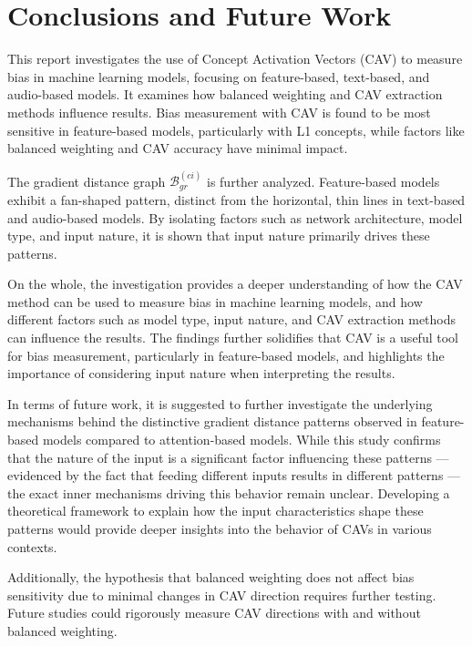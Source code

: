\chapter{Conclusions and Future Work} \label{chap:conclusions}

This report investigates the use of Concept Activation Vectors (CAV) to measure bias in machine learning models, focusing on feature-based, text-based, and audio-based models. It examines how balanced weighting and CAV extraction methods influence results. Bias measurement with CAV is found to be most sensitive in feature-based models, particularly with L1 concepts, while factors like balanced weighting and CAV accuracy have minimal impact.

The gradient distance graph $\mathcal{B}^{(ci)}_{gr}$ is further analyzed. Feature-based models exhibit a fan-shaped pattern, distinct from the horizontal, thin lines in text-based and audio-based models. By isolating factors such as network architecture, model type, and input nature, it is shown that input nature primarily drives these patterns.

On the whole, the investigation provides a deeper understanding of how the CAV method can be used to measure bias in machine learning models, and how different factors such as model type, input nature, and CAV extraction methods can influence the results. The findings further solidifies that CAV is a useful tool for bias measurement, particularly in feature-based models, and highlights the importance of considering input nature when interpreting the results.

In terms of future work, it is suggested to further investigate the underlying mechanisms behind the distinctive gradient distance patterns observed in feature-based models compared to attention-based models. While this study confirms that the nature of the input is a significant factor influencing these patterns — evidenced by the fact that feeding different inputs results in different patterns — the exact inner mechanisms driving this behavior remain unclear. Developing a theoretical framework to explain how the input characteristics shape these patterns would provide deeper insights into the behavior of CAVs in various contexts.

Additionally, the hypothesis that balanced weighting does not affect bias sensitivity due to minimal changes in CAV direction requires further testing. Future studies could rigorously measure CAV directions with and without balanced weighting.
